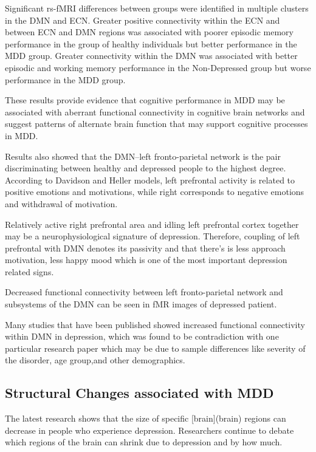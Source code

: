 \documentclass{article}
\begin{document}
Significant rs-fMRI differences between groups were identified in
multiple clusters in the DMN and ECN. Greater positive connectivity
within the ECN and between ECN and DMN regions was associated with
poorer episodic memory performance in the group of healthy individuals
but better performance in the MDD group. Greater connectivity within
the DMN was associated with better episodic and working memory
performance in the Non-Depressed group but worse performance in the
MDD group.

These results provide evidence that cognitive performance in MDD may
be associated with aberrant functional connectivity in cognitive brain
networks and suggest patterns of alternate brain function that may
support cognitive processes in MDD.

Results also showed that the DMN–left fronto-parietal network is the
pair discriminating between healthy and depressed people to the
highest degree. According to Davidson and Heller models, left
prefrontal activity is related to positive emotions and motivations,
while right corresponds to negative emotions and withdrawal of
motivation.

Relatively active right prefrontal area and idling left
prefrontal cortex together may be a neurophysiological signature of
depression. Therefore, coupling of left prefrontal with DMN denotes
its passivity and that there's is less approach motivation, less happy
mood which is one of the most important depression related signs.


Decreased functional connectivity between left fronto-parietal network
and subsystems of the DMN can be seen in fMR images of depressed
patient.

Many studies that have been published showed increased functional
connectivity within DMN in depression, which was found to be
contradiction with one particular research paper which may be due to
sample differences like severity of the disorder, age group,and other
demographics.

\newpage
\subsection{Structural Changes associated with MDD}

The latest research shows that the size of specific [brain](brain)
regions can decrease in people who experience depression. Researchers
continue to debate which regions of the brain can shrink due to
depression and by how much.
\end{document}
